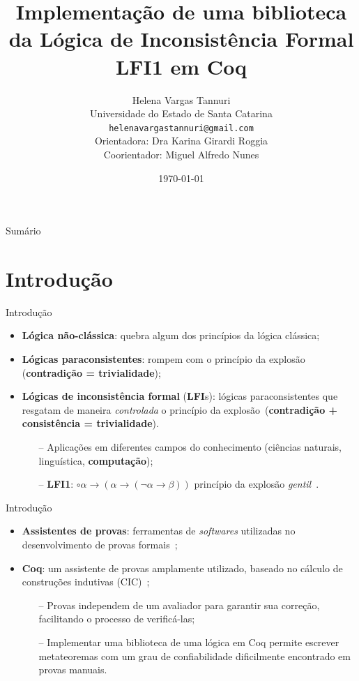 \documentclass[table]{beamer}
\title[]{Implementação de uma biblioteca da Lógica de Inconsistência Formal LFI1 em Coq}
\author[Helena Vargas Tannuri]{
    Helena Vargas Tannuri\\\smallskip
    {\scriptsize Universidade do Estado de Santa Catarina \\\smallskip
    \vspace{-2mm}
    \texttt{helenavargastannuri@gmail.com}\\\medskip
    {Orientadora: Dra Karina Girardi Roggia}\\
    {Coorientador: Miguel Alfredo Nunes}
    }
}
\date{\today}
\newcommand{\lfium}{{\normalfont\textbf{LFI1}}}
\newcommand{\lfis}{{\normalfont\textbf{LFI}s}}
\def\\{}%
\begin{document}
    \begin{frame}
        \titlepage
    \end{frame}

    \begin{frame}[allowframebreaks]{Sumário}
        \tableofcontents
    \end{frame}

\section[]{Introdução}
    \begin{frame}{Introdução}
        \begin{itemize}
            \item \textbf{Lógica não-clássica}: quebra algum dos princípios da lógica clássica;
            \item \textbf{Lógicas paraconsistentes}: rompem com o princípio da explosão (\textbf{contradição = trivialidade});
            \item \textbf{Lógicas de inconsistência formal} (\lfis{}): lógicas paraconsistentes que resgatam de maneira \textit{controlada} o princípio da explosão~\cite{Carnielli_Coniglio_2016}\\(\textbf{contradição + consistência = trivialidade}).
            \begin{itemize}
                \item[--] Aplicações em diferentes campos do conhecimento (ciências naturais, linguística, \textbf{computação});
                \item[--] \lfium{}: $\circ \alpha \to (\alpha \to (\neg \alpha \to \beta))$ princípio da explosão \textit{gentil}~\cite{carnielli2000formal}.
            \end{itemize}
        \end{itemize}
    \end{frame}

    \begin{frame}{Introdução}
        \begin{itemize}
            \item \textbf{Assistentes de provas}: ferramentas de \textit{softwares} utilizadas no desenvolvimento de provas formais~\cite{Chlipala_2013};
            \item \textbf{Coq}: um assistente de provas amplamente utilizado, baseado no cálculo de construções indutivas (CIC)~\cite{silva2019certificaccao};
            \begin{itemize}
                \item[--] Provas independem de um avaliador para garantir sua correção, facilitando o processo de verificá-las;
                \item[--] Implementar uma biblioteca de uma lógica em Coq permite escrever metateoremas com um grau de confiabilidade dificilmente encontrado em provas manuais.
            \end{itemize}
        \end{itemize}
    \end{frame}
\end{document}
